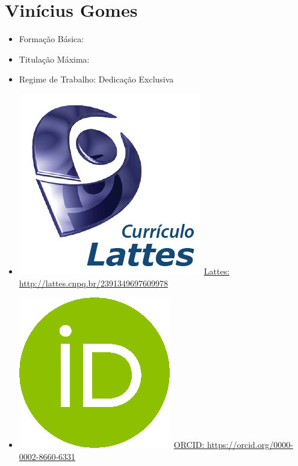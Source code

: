 \documentclass[11pt,fleqn]{book} %
\begin{document}
\section{Vinícius Gomes}\label{ViniciusGomes}
\begin{itemize}
	\item Formação Básica: 
	\item Titulação Máxima: 
	\item Regime de Trabalho: Dedicação Exclusiva
	\item \includegraphics[scale=.03]{Pictures/lattes}~\href{http://lattes.cnpq.br/2391349697609978}{Lattes: http://lattes.cnpq.br/2391349697609978}
	\item \includegraphics[scale=.15]{Pictures/orcid}~\href{https://orcid.org/0000-0002-8660-6331}{ORCID: https://orcid.org/0000-0002-8660-6331}
\end{itemize}
\end{document}
